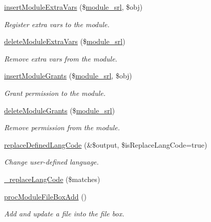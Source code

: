 \begin{DoxyCompactItemize}
\hyperlink{classmoduleController_a1a8373bfcd3e1e8bc88f41bb777ad486}{insert\-Module\-Extra\-Vars} (\$\hyperlink{ko_8install_8php_a370bb6450fab1da3e0ed9f484a38b761}{module\-\_\-srl}, \$obj)
\begin{DoxyCompactList}\small\item\em Register extra vars to the module. \end{DoxyCompactList}\item 
\hyperlink{classmoduleController_aff9b45ce153dcad735896f56fe60516f}{delete\-Module\-Extra\-Vars} (\$\hyperlink{ko_8install_8php_a370bb6450fab1da3e0ed9f484a38b761}{module\-\_\-srl})
\begin{DoxyCompactList}\small\item\em Remove extra vars from the module. \end{DoxyCompactList}\item 
\hyperlink{classmoduleController_a551eda7765398673c806ca1def44c7ac}{insert\-Module\-Grants} (\$\hyperlink{ko_8install_8php_a370bb6450fab1da3e0ed9f484a38b761}{module\-\_\-srl}, \$obj)
\begin{DoxyCompactList}\small\item\em Grant permission to the module. \end{DoxyCompactList}\item 
\hyperlink{classmoduleController_a34f1a44321986a8f4692be393d6a5c85}{delete\-Module\-Grants} (\$\hyperlink{ko_8install_8php_a370bb6450fab1da3e0ed9f484a38b761}{module\-\_\-srl})
\begin{DoxyCompactList}\small\item\em Remove permission from the module. \end{DoxyCompactList}\item 
\hyperlink{classmoduleController_ace764298e1aee4006ecd8dbf7aaf4007}{replace\-Defined\-Lang\-Code} (\&\$output, \$is\-Replace\-Lang\-Code=true)
\begin{DoxyCompactList}\small\item\em Change user-\/defined language. \end{DoxyCompactList}\item 
\hyperlink{classmoduleController_a0d4e5ad494cacf50288a3f6e9f013a5d}{\-\_\-replace\-Lang\-Code} (\$matches)
\item 
\hyperlink{classmoduleController_a456022e1fca3a204b9b2b828b501fefb}{proc\-Module\-File\-Box\-Add} ()
\begin{DoxyCompactList}\small\item\em Add and update a file into the file box. \end{DoxyCompactList}\item 

\end{DoxyCompactItemize}
